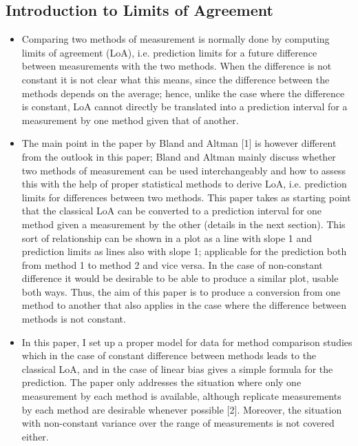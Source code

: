 \documentclass[Main.tex]{subfiles}
\begin{document}
	\subsection{Introduction to Limits of Agreement}
	\begin{itemize}
		\item Comparing two methods of measurement is normally done by computing limits of agreement (LoA), i.e. prediction limits for
		a future difference between measurements with the two methods. When the difference is not constant it is not clear what
		this means, since the difference between the methods depends on the average; hence, unlike the case where the difference is
		constant, LoA cannot directly be translated into a prediction interval for a measurement by one method given that of another.
		\item The main point in the paper by Bland and Altman [1] is however different from the outlook in this paper; Bland and Altman
		mainly discuss whether two methods of measurement can be used interchangeably and how to assess this with the help of
		proper statistical methods to derive LoA, i.e. prediction limits for differences between two methods.
		This paper takes as starting point that the classical LoA can be converted to a prediction interval for one method given a
		measurement by the other (details in the next section). This sort of relationship can be shown in a plot as a line with slope 1
		and prediction limits as lines also with slope 1; applicable for the prediction both from method 1 to method 2 and vice versa. In
		the case of non-constant difference it would be desirable to be able to produce a similar plot, usable both ways. Thus, the aim
		of this paper is to produce a conversion from one method to another that also applies in the case where the difference between
		methods is not constant.
		\item In this paper, I set up a proper model for data for method comparison studies which in the case of constant difference between
		methods leads to the classical LoA, and in the case of linear bias gives a simple formula for the prediction. The paper only
		addresses the situation where only one measurement by each method is available, although replicate measurements by each
		method are desirable whenever possible [2]. Moreover, the situation with non-constant variance over the range of measurements
		is not covered either.
	\end{itemize}
\end{document}
